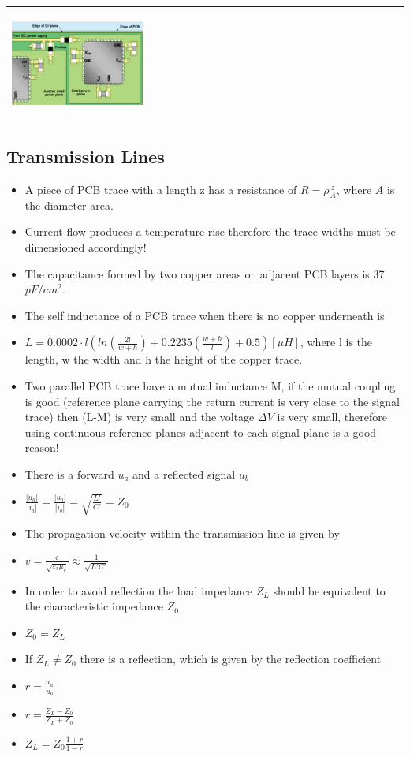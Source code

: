 \begin{table}[h!]
\begin{tabular}{|m{}|m{}|}
					\begin{center}\includegraphics[width=0.35\textwidth]{images/FerriteDecouple2.png}\end{center} 
			\\
			\hline
			\end{tabular}
		\end{table}
	\clearpage
	\subsection{Transmission Lines}
		\begin{itemize}
			\setlength{\itemsep}{-4pt}
			\item A piece of PCB trace with a length z has a resistance of $R = \rho \frac{z}{A}$, where $A$ is the diameter area. 
			\item Current flow produces a temperature rise therefore the trace widths must be dimensioned accordingly!
			\item The capacitance formed by two copper areas on adjacent PCB layers is 37 $pF/cm^2$. 
			\item The self inductance of a PCB trace when there is no copper underneath is 
			\item[] $L = 0.0002\cdot l \left(ln\left(\frac{2l}{w+h}\right)+ 0.2235\left(\frac{w+h}{l}\right)+0.5\right) [\mu H]$, where l is the length, w the width and h the height of the copper trace. 
			\item Two parallel PCB trace have a mutual inductance M, if the mutual coupling is good (reference plane carrying the return current is very close to the signal trace) then (L-M) is very small and the voltage $\Delta V$ is very small, therefore using continuous reference planes adjacent to each signal plane is a good reason! 
			\item There is a forward $u_a$ and a reflected signal $u_b$
			\item[] $\frac{|u_a|}{|i_a|} = \frac{|u_b|}{|i_b|} = \sqrt{\frac{L'}{C'}} = Z_0$
			\item The propagation velocity within the transmission line is given by
			\item[] $v = \frac{c}{\sqrt{\varepsilon_r \mu_r}} \approx \frac{1}{\sqrt{L' C'}}$
			\item In order to avoid reflection the load impedance $Z_L$ should be equivalent to the characteristic impedance $Z_0$
			\item[] $Z_0 = Z_L$
			\item If $Z_L \neq Z_0$ there is a reflection, which is given by the reflection coefficient
			\item[] $r = \frac{u_a}{u_b}$
			\item[] $r = \frac{Z_L - Z_0}{Z_L + Z_0}$
			\item[] $Z_L = Z_0 \frac{1+r}{1-r}$
		\end{itemize}
